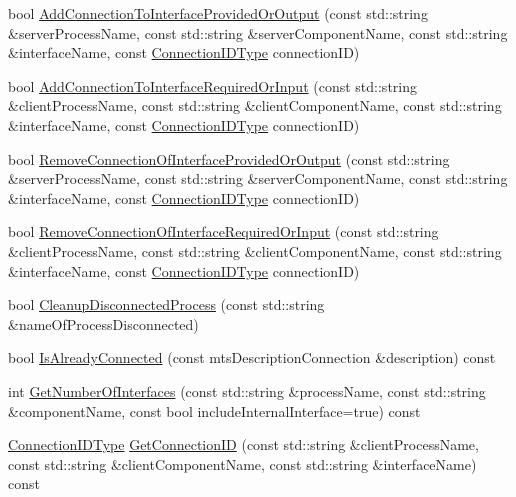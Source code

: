 \begin{DoxyCompactItemize}
\item 
bool \hyperlink{classmts_manager_global_ababac733270efb19c7aaecbe2334c96a}{Add\+Connection\+To\+Interface\+Provided\+Or\+Output} (const std\+::string \&server\+Process\+Name, const std\+::string \&server\+Component\+Name, const std\+::string \&interface\+Name, const \hyperlink{mts_forward_declarations_8h_ad3543bb11742e1766374ec96016d6547}{Connection\+I\+D\+Type} connection\+I\+D)
\item 
bool \hyperlink{classmts_manager_global_abbcbd4b173b16bb526bd6ac3381aa91b}{Add\+Connection\+To\+Interface\+Required\+Or\+Input} (const std\+::string \&client\+Process\+Name, const std\+::string \&client\+Component\+Name, const std\+::string \&interface\+Name, const \hyperlink{mts_forward_declarations_8h_ad3543bb11742e1766374ec96016d6547}{Connection\+I\+D\+Type} connection\+I\+D)
\item 
bool \hyperlink{classmts_manager_global_a81e63fe6a44457f8e867dfeb85a3247d}{Remove\+Connection\+Of\+Interface\+Provided\+Or\+Output} (const std\+::string \&server\+Process\+Name, const std\+::string \&server\+Component\+Name, const std\+::string \&interface\+Name, const \hyperlink{mts_forward_declarations_8h_ad3543bb11742e1766374ec96016d6547}{Connection\+I\+D\+Type} connection\+I\+D)
\item 
bool \hyperlink{classmts_manager_global_acaa9d8d96ff161094790ccfa9e6e3336}{Remove\+Connection\+Of\+Interface\+Required\+Or\+Input} (const std\+::string \&client\+Process\+Name, const std\+::string \&client\+Component\+Name, const std\+::string \&interface\+Name, const \hyperlink{mts_forward_declarations_8h_ad3543bb11742e1766374ec96016d6547}{Connection\+I\+D\+Type} connection\+I\+D)
\item 
bool \hyperlink{classmts_manager_global_a115d9b7e7e1b0125977ac0f737484537}{Cleanup\+Disconnected\+Process} (const std\+::string \&name\+Of\+Process\+Disconnected)
\item 
bool \hyperlink{classmts_manager_global_ab6db0d6f1e9d0717199bdbfdce5141e5}{Is\+Already\+Connected} (const mts\+Description\+Connection \&description) const 
\item 
int \hyperlink{classmts_manager_global_a0e3e1f31090dfa4288608b611bd5c723}{Get\+Number\+Of\+Interfaces} (const std\+::string \&process\+Name, const std\+::string \&component\+Name, const bool include\+Internal\+Interface=true) const 
\item 
\hyperlink{mts_forward_declarations_8h_ad3543bb11742e1766374ec96016d6547}{Connection\+I\+D\+Type} \hyperlink{classmts_manager_global_a1305debbb9848297d7f8079506c6ad75}{Get\+Connection\+I\+D} (const std\+::string \&client\+Process\+Name, const std\+::string \&client\+Component\+Name, const std\+::string \&interface\+Name) const 

\end{DoxyCompactItemize}
